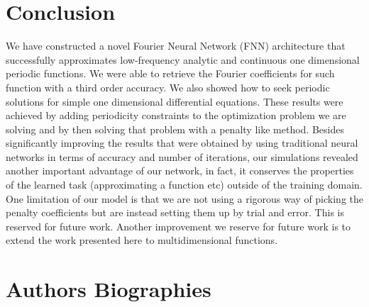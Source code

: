 \documentclass[AMS,STIX1COL]{WileyNJD-v2}
\begin{document}



\section{Conclusion}
We have constructed a novel Fourier Neural Network (FNN) architecture that successfully approximates low-frequency analytic and continuous one dimensional periodic functions. We were able to retrieve the Fourier coefficients for such function with a third order accuracy. We also showed how to seek periodic solutions for simple one dimensional differential equations. These results were achieved by adding periodicity constraints to the optimization problem we are solving and by then solving that problem with a penalty like method. Besides significantly improving the results that were obtained by using traditional neural networks in terms of accuracy and number of iterations, our simulations revealed another important advantage of our network, in fact, it conserves the properties of the learned task (approximating a function etc) outside of the training domain. One limitation of our model is that we are not using a rigorous way of picking the penalty coefficients but are instead setting them up by trial and error. This is reserved for future work. Another improvement we reserve for future work is to extend the work presented here to multidimensional functions.



























\section*{Authors Biographies}
\end{document}
